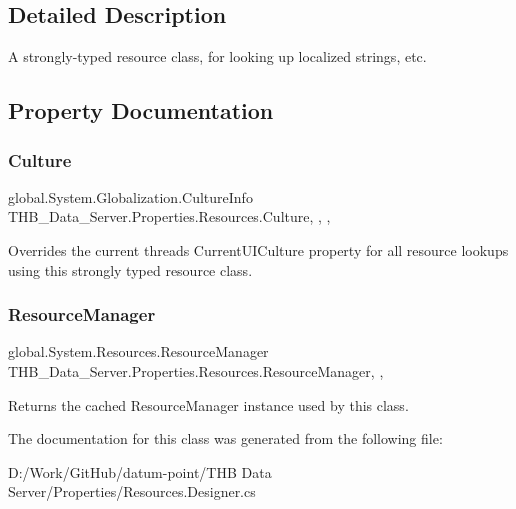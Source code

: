 \subsection{Detailed Description}
A strongly-\/typed resource class, for looking up localized strings, etc. 



\subsection{Property Documentation}
\mbox{\label{class_t_h_b___data___server_1_1_properties_1_1_resources_a0f9c72f240b5984d2407f2bab6d3372a}} 
\subsubsection{\texorpdfstring{Culture}{Culture}}
{\footnotesize\ttfamily global.\+System.\+Globalization.\+Culture\+Info T\+H\+B\+\_\+\+Data\+\_\+\+Server.\+Properties.\+Resources.\+Culture\hspace{0.3cm}{\ttfamily [static]}, {\ttfamily [get]}, {\ttfamily [set]}, {\ttfamily [package]}}



Overrides the current thread\textquotesingle{}s Current\+U\+I\+Culture property for all resource lookups using this strongly typed resource class. 

\mbox{\label{class_t_h_b___data___server_1_1_properties_1_1_resources_a1e2436decacf2127dc5f33a45302bb1a}} 
\subsubsection{\texorpdfstring{Resource\+Manager}{ResourceManager}}
{\footnotesize\ttfamily global.\+System.\+Resources.\+Resource\+Manager T\+H\+B\+\_\+\+Data\+\_\+\+Server.\+Properties.\+Resources.\+Resource\+Manager\hspace{0.3cm}{\ttfamily [static]}, {\ttfamily [get]}, {\ttfamily [package]}}



Returns the cached Resource\+Manager instance used by this class. 



The documentation for this class was generated from the following file\+:\begin{DoxyCompactItemize}
\item 
D\+:/\+Work/\+Git\+Hub/datum-\/point/\+T\+H\+B Data Server/\+Properties/Resources.\+Designer.\+cs\end{DoxyCompactItemize}
